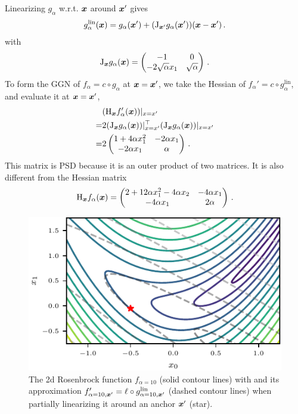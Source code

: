 \begin{example}
  Linearizing $g_{\alpha}$ w.r.t. ${\bm{x}}$ around ${\bm{x}}'$ gives
  \begin{align*}
    g^{\text{lin}}_{\alpha}({\bm{x}}) = g_{\alpha}({\bm{x}}') + (\mathrm{J}_{{\bm{x}}'}g_{\alpha}({\bm{x}}')) ({\bm{x}} - {\bm{x}}')\,.
  \end{align*}
  with
  \begin{align*}
    \mathrm{J}_{{\bm{x}}}g_{\alpha}({\bm{x}})
    =
    \begin{pmatrix}
      -1                   & 0             \\
      -2 \sqrt{\alpha} x_1 & \sqrt{\alpha}
    \end{pmatrix}\,.
  \end{align*}
  To form the GGN of $f_{\alpha} = c \circ g_{\alpha}$ at ${\bm{x}} = {\bm{x}}'$, we take the Hessian of $f_{\alpha}' = c \circ g_{\alpha}^{\text{lin}}$, and evaluate it at ${\bm{x}} = {\bm{x}}'$,
  \begin{align*}
      & (\mathrm{H}_{{\bm{x}}} f_{\alpha}'({\bm{x}}))|_{x=x'}
    \\
    = & 2 (\mathrm{J}_{{\bm{x}}} g_{\alpha}({\bm{x}}))|_{x=x'}^{\top}
    (\mathrm{J}_{{\bm{x}}} g_{\alpha}({\bm{x}}))|_{x=x'}
    \\
    = & 2
    \begin{pmatrix}
      1 + 4\alpha x_1^2 & -2 \alpha x_1 \\
      -2 \alpha x_1     & \alpha
    \end{pmatrix}\,.
  \end{align*}
  This matrix is PSD because it is an outer product of two matrices.
  It is also different from the Hessian matrix
  \begin{align*}
    \mathrm{H}_{{\bm{x}}} f_{\alpha}({\bm{x}})
    =
    \begin{pmatrix}
      2 + 12 \alpha x_1^2 - 4 \alpha x_2 & -4 \alpha x_1 \\
      -4 \alpha x_1                      & 2 \alpha
    \end{pmatrix}\,.
  \end{align*}
  \begin{figure}[H]
    \centering
    \includegraphics[width=\linewidth]{../kfs/plots/linearized_rosenbrock.pdf}
    \caption{The 2d Rosenbrock function $f_{\alpha=10}$ (solid contour lines) with and its approximation $f'_{\alpha=10, {\bm{x}}'} = \ell \circ g^{\text{lin}}_{\alpha=10, {\bm{x}}'}$ (dashed contour lines) when partially linearizing it around an anchor ${\bm{x}}'$ (star).}
  \end{figure}
\end{example}

